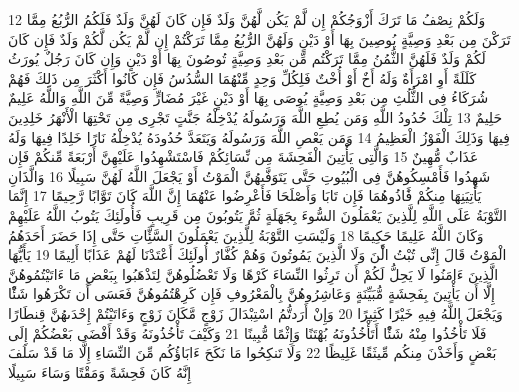 {\tiny\colorbox{cl_aya}{12}} وَلَكُمْ نِصْفُ مَا تَرَكَ أَزْوَجُكُمْ إِن لَّمْ يَكُن لَّهُنَّ وَلَدٌ فَإِن كَانَ لَهُنَّ وَلَدٌ فَلَكُمُ الرُّبُعُ مِمَّا تَرَكْنَ مِن بَعْدِ وَصِيَّةٍ يُوصِينَ بِهَا أَوْ دَيْنٍ وَلَهُنَّ الرُّبُعُ مِمَّا تَرَكْتُمْ إِن لَّمْ يَكُن لَّكُمْ وَلَدٌ فَإِن كَانَ لَكُمْ وَلَدٌ فَلَهُنَّ الثُّمُنُ مِمَّا تَرَكْتُم مِّن بَعْدِ وَصِيَّةٍ تُوصُونَ بِهَا أَوْ دَيْنٍ وَإِن كَانَ رَجُلٌ يُورَثُ كَلَلَةً أَوِ امْرَأَةٌ وَلَهُ أَخٌ أَوْ أُخْتٌ فَلِكُلِّ وَحِدٍ مِّنْهُمَا السُّدُسُ فَإِن كَانُوا أَكْثَرَ مِن ذَلِكَ فَهُمْ شُرَكَاءُ فِى الثُّلُثِ مِن بَعْدِ وَصِيَّةٍ يُوصَى بِهَا أَوْ دَيْنٍ غَيْرَ مُضَارٍّ وَصِيَّةً مِّنَ اللَّهِ وَاللَّهُ عَلِيمٌ حَلِيمٌ
{\tiny\colorbox{cl_aya}{13}} تِلْكَ حُدُودُ اللَّهِ وَمَن يُطِعِ اللَّهَ وَرَسُولَهُ يُدْخِلْهُ جَنَّتٍ تَجْرِى مِن تَحْتِهَا الْأَنْهَرُ خَلِدِينَ فِيهَا وَذَلِكَ الْفَوْزُ الْعَظِيمُ
{\tiny\colorbox{cl_aya}{14}} وَمَن يَعْصِ اللَّهَ وَرَسُولَهُ وَيَتَعَدَّ حُدُودَهُ يُدْخِلْهُ نَارًا خَلِدًا فِيهَا وَلَهُ عَذَابٌ مُّهِينٌ
{\tiny\colorbox{cl_aya}{15}} وَالَّتِى يَأْتِينَ الْفَحِشَةَ مِن نِّسَائِكُمْ فَاسْتَشْهِدُوا عَلَيْهِنَّ أَرْبَعَةً مِّنكُمْ فَإِن شَهِدُوا فَأَمْسِكُوهُنَّ فِى الْبُيُوتِ حَتَّى يَتَوَفَّىهُنَّ الْمَوْتُ أَوْ يَجْعَلَ اللَّهُ لَهُنَّ سَبِيلًا
{\tiny\colorbox{cl_aya}{16}} وَالَّذَانِ يَأْتِيَنِهَا مِنكُمْ فََٔاذُوهُمَا فَإِن تَابَا وَأَصْلَحَا فَأَعْرِضُوا عَنْهُمَا إِنَّ اللَّهَ كَانَ تَوَّابًا رَّحِيمًا
{\tiny\colorbox{cl_aya}{17}} إِنَّمَا التَّوْبَةُ عَلَى اللَّهِ لِلَّذِينَ يَعْمَلُونَ السُّوءَ بِجَهَلَةٍ ثُمَّ يَتُوبُونَ مِن قَرِيبٍ فَأُولَئِكَ يَتُوبُ اللَّهُ عَلَيْهِمْ وَكَانَ اللَّهُ عَلِيمًا حَكِيمًا
{\tiny\colorbox{cl_aya}{18}} وَلَيْسَتِ التَّوْبَةُ لِلَّذِينَ يَعْمَلُونَ السَّئَِّاتِ حَتَّى إِذَا حَضَرَ أَحَدَهُمُ الْمَوْتُ قَالَ إِنِّى تُبْتُ الَْٔنَ وَلَا الَّذِينَ يَمُوتُونَ وَهُمْ كُفَّارٌ أُولَئِكَ أَعْتَدْنَا لَهُمْ عَذَابًا أَلِيمًا
{\tiny\colorbox{cl_aya}{19}} يَأَيُّهَا الَّذِينَ ءَامَنُوا لَا يَحِلُّ لَكُمْ أَن تَرِثُوا النِّسَاءَ كَرْهًا وَلَا تَعْضُلُوهُنَّ لِتَذْهَبُوا بِبَعْضِ مَا ءَاتَيْتُمُوهُنَّ إِلَّا أَن يَأْتِينَ بِفَحِشَةٍ مُّبَيِّنَةٍ وَعَاشِرُوهُنَّ بِالْمَعْرُوفِ فَإِن كَرِهْتُمُوهُنَّ فَعَسَى أَن تَكْرَهُوا شَئًْا وَيَجْعَلَ اللَّهُ فِيهِ خَيْرًا كَثِيرًا
{\tiny\colorbox{cl_aya}{20}} وَإِنْ أَرَدتُّمُ اسْتِبْدَالَ زَوْجٍ مَّكَانَ زَوْجٍ وَءَاتَيْتُمْ إِحْدَىهُنَّ قِنطَارًا فَلَا تَأْخُذُوا مِنْهُ شَئًْا أَتَأْخُذُونَهُ بُهْتَنًا وَإِثْمًا مُّبِينًا
{\tiny\colorbox{cl_aya}{21}} وَكَيْفَ تَأْخُذُونَهُ وَقَدْ أَفْضَى بَعْضُكُمْ إِلَى بَعْضٍ وَأَخَذْنَ مِنكُم مِّيثَقًا غَلِيظًا
{\tiny\colorbox{cl_aya}{22}} وَلَا تَنكِحُوا مَا نَكَحَ ءَابَاؤُكُم مِّنَ النِّسَاءِ إِلَّا مَا قَدْ سَلَفَ إِنَّهُ كَانَ فَحِشَةً وَمَقْتًا وَسَاءَ سَبِيلًا
